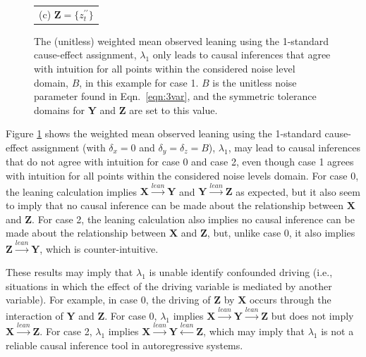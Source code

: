 \documentclass[twocolumn,aps,pre,groupedaddress]{revtex4-1}
\begin{document}
\begin{figure}[ht]
\begin{tabular}{cc}
\multicolumn{2}{c}{(c) $\mathbf{Z} = \{z^{\prime\prime}_t\}$}\\
\end{tabular}
\caption{The (unitless) weighted mean observed leaning using the 1-standard cause-effect assignment, $\lambda_1$ only leads to causal inferences that agree with intuition for all points within the considered noise level domain, $B$, in this example for case 1.  $B$ is the unitless noise parameter found in Eqn.\ \ref{eqn:3var}, and the symmetric tolerance domains for $\mathbf{Y}$ and $\mathbf{Z}$ are set to this value.}
\label{fig:3var}
\end{figure}
Figure \ref{fig:3var} shows the weighted mean observed leaning using the 1-standard cause-effect assignment (with $\delta_x = 0$ and $\delta_y = \delta_z = B$), $\lambda_1$, may lead to causal inferences that do not agree with intuition for case 0 and case 2, even though case 1 agrees with intuition for all points within the considered noise levels domain.  For case 0, the leaning calculation implies $\mathbf{X}\xrightarrow{lean}\mathbf{Y}$ and $\mathbf{Y}\xrightarrow{lean}\mathbf{Z}$ as expected, but it also seem to imply that no causal inference can be made about the relationship between $\mathbf{X}$ and $\mathbf{Z}$.  For case 2, the leaning calculation also implies no causal inference can be made about the relationship between $\mathbf{X}$ and $\mathbf{Z}$, but, unlike case 0, it also implies $\mathbf{Z}\xrightarrow{lean}\mathbf{Y}$, which is counter-intuitive.

These results may imply that $\lambda_1$ is unable identify confounded driving (i.e., situations in which the effect of the driving variable is mediated by another variable).  For example, in case 0, the driving of $\mathbf{Z}$ by $\mathbf{X}$ occurs through the interaction of $\mathbf{Y}$ and $\mathbf{Z}$.  For case 0, $\lambda_1$ implies $\mathbf{X}\xrightarrow{lean}\mathbf{Y}\xrightarrow{lean}\mathbf{Z}$ but does not imply $\mathbf{X}\xrightarrow{lean}\mathbf{Z}$.  For case 2, $\lambda_1$ implies $\mathbf{X}\xrightarrow{lean}\mathbf{Y}\xleftarrow{lean}\mathbf{Z}$, which may imply that $\lambda_1$ is not a reliable causal inference tool in autoregressive systems.
\end{document}

